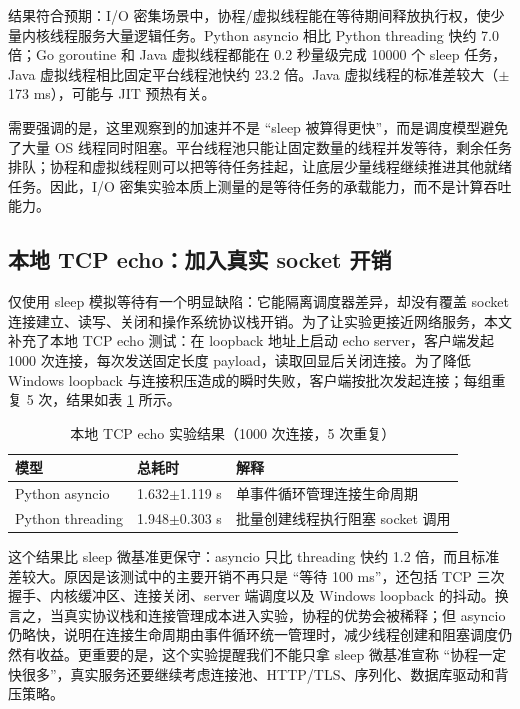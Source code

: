 \documentclass[UTF8,a4paper,12pt]{ctexart}
\begin{document}
结果符合预期：I/O 密集场景中，协程/虚拟线程能在等待期间释放执行权，使少量内核线程服务大量逻辑任务。Python asyncio 相比 Python threading 快约 7.0 倍；Go goroutine 和 Java 虚拟线程都能在 0.2 秒量级完成 10000 个 sleep 任务，Java 虚拟线程相比固定平台线程池快约 23.2 倍。Java 虚拟线程的标准差较大（$\pm$173 ms），可能与 JIT 预热有关。

需要强调的是，这里观察到的加速并不是 ``sleep 被算得更快''，而是调度模型避免了大量 OS 线程同时阻塞。平台线程池只能让固定数量的线程并发等待，剩余任务排队；协程和虚拟线程则可以把等待任务挂起，让底层少量线程继续推进其他就绪任务。因此，I/O 密集实验本质上测量的是等待任务的承载能力，而不是计算吞吐能力。

\subsection{本地 TCP echo：加入真实 socket 开销}

仅使用 sleep 模拟等待有一个明显缺陷：它能隔离调度器差异，却没有覆盖 socket 连接建立、读写、关闭和操作系统协议栈开销。为了让实验更接近网络服务，本文补充了本地 TCP echo 测试：在 loopback 地址上启动 echo server，客户端发起 1000 次连接，每次发送固定长度 payload，读取回显后关闭连接。为了降低 Windows loopback 与连接积压造成的瞬时失败，客户端按批次发起连接；每组重复 5 次，结果如表 \ref{tab:tcp-echo} 所示。

\begin{table}[H]
  \centering
  \caption{本地 TCP echo 实验结果（1000 次连接，5 次重复）}
  \begin{tabularx}{\textwidth}{l l X}
    \toprule
    模型 & 总耗时 & 解释 \\
    \midrule
    Python asyncio & 1.632$\pm$1.119 s & 单事件循环管理连接生命周期 \\
    Python threading & 1.948$\pm$0.303 s & 批量创建线程执行阻塞 socket 调用 \\
    \bottomrule
  \end{tabularx}
  \label{tab:tcp-echo}
\end{table}

这个结果比 sleep 微基准更保守：asyncio 只比 threading 快约 1.2 倍，而且标准差较大。原因是该测试中的主要开销不再只是 ``等待 100 ms''，还包括 TCP 三次握手、内核缓冲区、连接关闭、server 端调度以及 Windows loopback 的抖动。换言之，当真实协议栈和连接管理成本进入实验，协程的优势会被稀释；但 asyncio 仍略快，说明在连接生命周期由事件循环统一管理时，减少线程创建和阻塞调度仍然有收益。更重要的是，这个实验提醒我们不能只拿 sleep 微基准宣称 ``协程一定快很多''，真实服务还要继续考虑连接池、HTTP/TLS、序列化、数据库驱动和背压策略。
\end{document}
